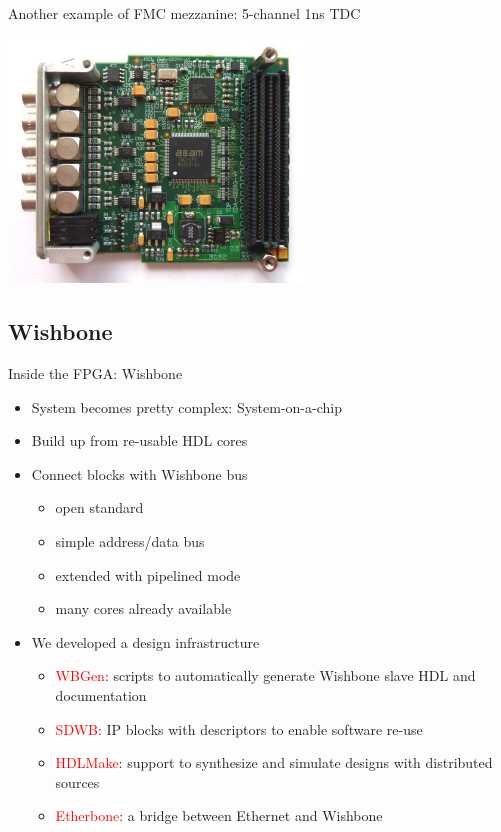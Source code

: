 \documentclass[compress,red]{beamer}
\begin{document}
\begin{frame}{Another example of FMC mezzanine: 5-channel 1ns TDC}
 \begin{center}
   \includegraphics[height=6.5cm]{FMC_TDC_72dpi_left.jpg}
 \end{center} 
\end{frame}



\subsection{Wishbone}

\begin{frame}{Inside the FPGA: Wishbone}
 \begin{itemize}
	\item System becomes pretty complex: System-on-a-chip
	\item Build up from re-usable HDL cores
	\item Connect blocks with Wishbone bus
		\begin{itemize}
		\item open standard
		\item simple address/data bus
		\item extended with pipelined mode
		\item many cores already available
		\end{itemize}
	\item We developed a design infrastructure
		\begin{itemize}
		\item \textcolor{red}{WBGen}: scripts to automatically generate Wishbone slave
                  HDL and documentation
		\item \textcolor{red}{SDWB}: IP blocks with descriptors to enable software re-use
		\item \textcolor{red}{HDLMake}: support to synthesize and simulate designs with distributed sources
		\item \textcolor{red}{Etherbone}: a bridge between Ethernet and Wishbone
		\end{itemize}
 \end{itemize}
\end{frame}
\end{document}

